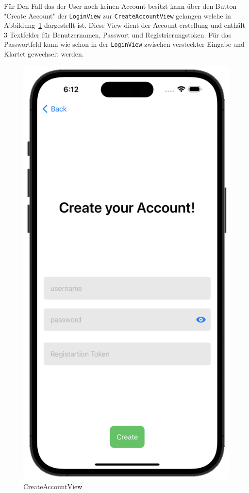     Für Den Fall das der User noch keinen Account besitzt kann über den Button "Create Account" der \texttt{LoginView} zur \texttt{CreateAccountView} gelangen welche in Abbildung~\ref{fig:createaccountview} dargestellt ist.
    Diese View dient der Account erstellung und enthält 3 Textfelder für Benutzernamen, Passwort und Registrierungstoken.
    Für das Passwortfeld kann wie schon in der \texttt{LoginView} zwischen versteckter Eingabe und Klartet gewechselt werden.
    \begin{figure}[h]
        \includegraphics[scale=0.5]{accountcreate_white}
        \centering
        \caption{CreateAccountView}\label{fig:createaccountview}
    \end{figure}
